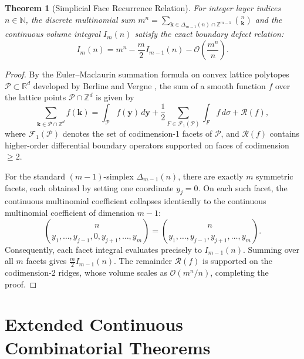 \documentclass[11pt,a4paper]{article}
\theoremstyle{plain}
\newtheorem{theorem}{Theorem}[section]
\theoremstyle{definition}
\theoremstyle{remark}
\numberwithin{equation}{section}
\begin{document}
\begin{theorem}[Simplicial Face Recurrence Relation]
For integer layer indices $n \in \mathbb{N}$, the discrete multinomial sum $m^n = \sum_{\mathbf{k} \in \Delta_{m-1}(n) \cap \mathbb{Z}^{m-1}} \binom{n}{\mathbf{k}}$ and the continuous volume integral $I_m(n)$ satisfy the exact boundary defect relation:
\begin{equation}
\boxed{I_m(n) = m^n - \frac{m}{2}I_{m-1}(n) - \mathcal{O}\left(\frac{m^n}{n}\right).}
\end{equation}
\end{theorem}

\begin{proof}
By the Euler--Maclaurin summation formula on convex lattice polytopes $\mathcal{P} \subset \mathbb{R}^{d}$ developed by Berline and Vergne \cite{berline2007}, the sum of a smooth function $f$ over the lattice points $\mathcal{P} \cap \mathbb{Z}^d$ is given by
\begin{equation}
\sum_{\mathbf{k} \in \mathcal{P} \cap \mathbb{Z}^d} f(\mathbf{k}) = \int_{\mathcal{P}} f(\mathbf{y})\,d\mathbf{y} + \frac{1}{2}\sum_{F \in \mathcal{F}_1(\mathcal{P})} \int_F f\,d\sigma + \mathcal{R}(f),
\end{equation}
where $\mathcal{F}_1(\mathcal{P})$ denotes the set of codimension-1 facets of $\mathcal{P}$, and $\mathcal{R}(f)$ contains higher-order differential boundary operators supported on faces of codimension $\ge 2$.

For the standard $(m-1)$-simplex $\Delta_{m-1}(n)$, there are exactly $m$ symmetric facets, each obtained by setting one coordinate $y_j = 0$. On each such facet, the continuous multinomial coefficient collapses identically to the continuous multinomial coefficient of dimension $m-1$:
\begin{equation}
\binom{n}{y_1, \dots, y_{j-1}, 0, y_{j+1}, \dots, y_m} = \binom{n}{y_1, \dots, y_{j-1}, y_{j+1}, \dots, y_m}.
\end{equation}
Consequently, each facet integral evaluates precisely to $I_{m-1}(n)$. Summing over all $m$ facets gives $\frac{m}{2}I_{m-1}(n)$. The remainder $\mathcal{R}(f)$ is supported on the codimension-2 ridges, whose volume scales as $\mathcal{O}(m^n/n)$, completing the proof.
\end{proof}

\section{Extended Continuous Combinatorial Theorems}
\end{document}
